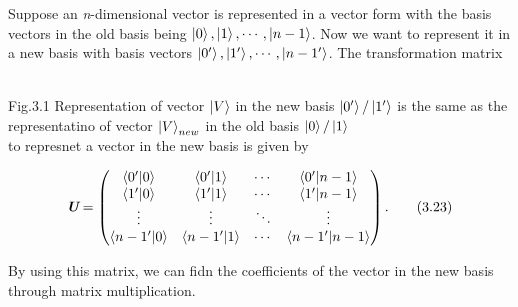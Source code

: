\documentclass{article}
\begin{document}
Suppose an \textit{n}-dimensional vector is represented in a vector form with the basis vectors in the old
basis being $\ket{0},\ket{1},\cdots,\ket{n-1}$. Now we want to represent it in
a new basis with basis vectors $\ket{0^\prime},\ket{1^\prime},\cdots,\ket{n-1^\prime}$.
The transformation matrix
\\\\


\begin{center}

    
\end{center}
Fig.3.1 Representation of vector $\ket{V}$ in the new basis $\ket{0^\prime}/\ket{1^\prime}$ 
is the same as the representatino of vector $\ket{V}_{new}$ in the old basis $\ket{0}/\ket{1}$
\\
to represnet a vector in the new basis is given by

\begin{equation} \label{eq 3.23}
    \textit{\textbf{U}}=\begin{pmatrix}
        \braket{0^\prime|0}&\braket{0^\prime|1}&\cdots&\braket{0^\prime|n-1}\\
        \braket{1^\prime|0}&\braket{1^\prime|1}&\cdots&\braket{1^\prime|n-1}\\
        \vdots&\vdots&\ddots&\vdots\\
        \braket{n-1^\prime|0}&\braket{n-1^\prime|1}&\cdots&\braket{n-1^\prime|n-1}\\        
    \end{pmatrix}. \tag{3.23}
\end{equation}

By using this matrix, we can fidn the coefficients of the vector in the new basis
through matrix multiplication.
\end{document}

